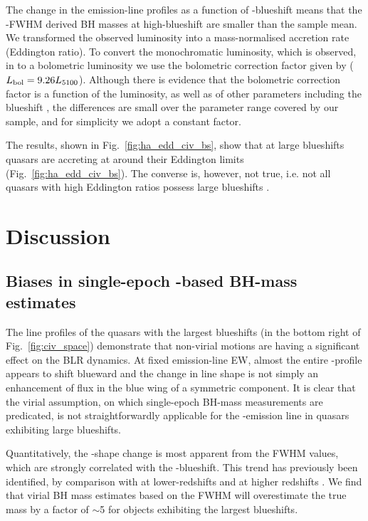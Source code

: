 The change in the \ha emission-line profiles as a function of -blueshift means that the \hans-FWHM derived BH masses at high-blueshift are smaller than the sample mean. 
We transformed the observed luminosity into a mass-normalised accretion rate (Eddington ratio).
To convert the monochromatic luminosity, which is observed, in to a bolometric luminosity we use the bolometric correction factor given by \citet{richards06} ($L_{\rm bol} = 9.26L_{5100}$).
Although there is evidence that the bolometric correction factor is a function of the luminosity, as well as of other parameters including the  blueshift \citep{krawczyk13}, the differences are small over the parameter range covered by our sample, and for simplicity we adopt a constant factor. 

The results, shown in Fig.~\ref{fig:ha_edd_civ_bs}, show that at large blueshifts quasars are accreting at around their Eddington limits (Fig.~\ref{fig:ha_edd_civ_bs}). 
The converse is, however, not true, i.e. not all quasars with high Eddington ratios possess large  blueshifts \citep[see][]{baskin05}.

\section{Discussion}
\label{sec:discussion}

\subsection{Biases in single-epoch -based BH-mass estimates}
\label{sec:discussionbiases}

The  line profiles of the quasars with  the largest  blueshifts (in the bottom right of Fig.~\ref{fig:civ_space}) demonstrate that non-virial motions are having a significant effect on the  BLR dynamics. 
At fixed emission-line EW, almost the entire -profile appears to shift blueward and the change in line shape is not simply an enhancement of flux in the blue wing of a symmetric component. 
It is clear that the virial assumption, on which single-epoch BH-mass measurements are predicated, is not straightforwardly applicable for the -emission line in quasars exhibiting large blueshifts. 

Quantitatively, the -shape change is most apparent from the FWHM values, which are strongly correlated with the -blueshift. 
This trend has previously been identified, by comparison with  at lower-redshifts \citep{shen08,shen11} and \hb at higher redshifts \citep{shen12}.
We find that virial BH mass estimates based on the  FWHM will overestimate the true mass by a factor of $\sim$5 for objects exhibiting the largest  blueshifts. 

